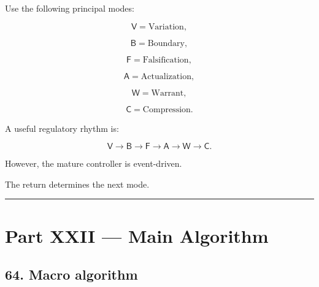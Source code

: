 \documentclass[
]{article}
\begin{document}
Use the following principal modes:

\[
\mathsf V=\text{Variation},
\]

\[
\mathsf B=\text{Boundary},
\]

\[
\mathsf F=\text{Falsification},
\]

\[
\mathsf A=\text{Actualization},
\]

\[
\mathsf W=\text{Warrant},
\]

\[
\mathsf C=\text{Compression}.
\]

A useful regulatory rhythm is:

\[
\boxed{
\mathsf V
\to
\mathsf B
\to
\mathsf F
\to
\mathsf A
\to
\mathsf W
\to
\mathsf C.
}
\]

However, the mature controller is event-driven.

The return determines the next mode.

\begin{center}\rule{0.5\linewidth}{0.5pt}\end{center}

\section{Part XXII --- Main Algorithm}\label{part-xxii-main-algorithm}

\subsection{64. Macro algorithm}\label{macro-algorithm}
\end{document}
